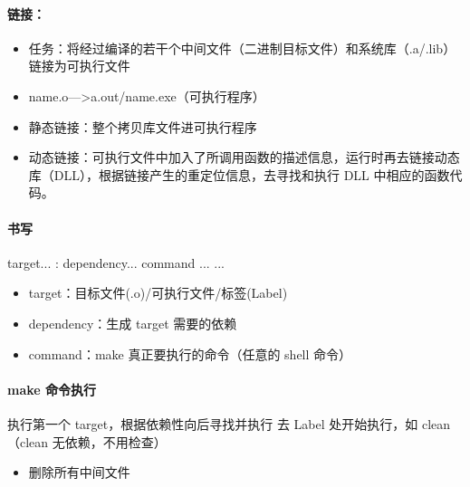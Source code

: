 \documentclass[a4paper,12pt,english]{sphinxmanual}
\begin{document}
\paragraph{链接：}
\label{\detokenize{dev-board/clion:id6}}\begin{itemize}
\item {} 
\sphinxAtStartPar
任务：将经过编译的若干个中间文件（二进制目标文件）和系统库（.a/.lib）链接为可执行文件

\item {} 
\sphinxAtStartPar
name.o—\sphinxhyphen{}>a.out/name.exe（可执行程序）

\item {} 
\sphinxAtStartPar
静态链接：整个拷贝库文件进可执行程序

\item {} 
\sphinxAtStartPar
动态链接：可执行文件中加入了所调用函数的描述信息，运行时再去链接动态库（DLL），根据链接产生的重定位信息，去寻找和执行 DLL 中相应的函数代码。

\end{itemize}


\paragraph{ 书写}
\label{\detokenize{dev-board/clion:makefile}}
\begin{sphinxVerbatim}[commandchars=\\\{\}]
target... : dependency...
command
...
...

\end{sphinxVerbatim}
\begin{itemize}
\item {} 
\sphinxAtStartPar
target：目标文件(.o)/可执行文件/标签(Label)

\item {} 
\sphinxAtStartPar
dependency：生成 target 需要的依赖

\item {} 
\sphinxAtStartPar
command：make 真正要执行的命令（任意的 shell 命令）

\end{itemize}


\paragraph{make 命令执行}
\label{\detokenize{dev-board/clion:id7}}
\sphinxAtStartPar
{}
执行第一个 target，根据依赖性向后寻找并执行
去 Label 处开始执行，如 clean（clean 无依赖，不用检查）
\begin{itemize}
\item {} 
\sphinxAtStartPar
删除所有中间文件

\end{itemize}
\end{document}
